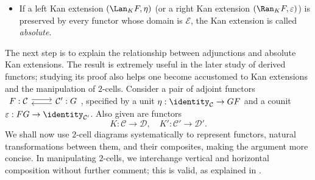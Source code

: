 \begin{definition}
\begin{itemize}
\[\begin{tikzcd}[column sep=large]
			\mathcal{D} \arrow[r, "{\Lan_K F}"'] \arrow[Rightarrow, from=F, "\eta" description] & \mathcal{E} \arrow[r, "M"'] & \mathcal{F}
		\end{tikzcd} =: \begin{tikzcd}
			\mathcal{C} \arrow[rr, "MF", ""{name=MF}] \arrow[rd, "K"'] & & \mathcal{F}  \\
			& \mathcal{D} \arrow[ru, "{M \Lan_K F}"'] \arrow[Rightarrow, from=MF, "M\eta" description] &
		\end{tikzcd}\]
		gives a left Kan extension of $MF$ along $K$.
		\item If a left Kan extension $(\Lan_K F, \eta)$ (or a right Kan
		extension $(\Ran_K F, \varepsilon)$) is preserved by every functor whose
		domain is $\mathcal{E}$, the Kan extension is called \emph{absolute}.
	\end{itemize}
\end{definition}

The next step is to explain the relationship between adjunctions and absolute
Kan extensions. The result is extremely useful in the later study of derived
functors; studying its proof also helps one become accustomed to Kan
extensions and the manipulation of $2$-cells. Consider a pair of adjoint
functors
$\begin{tikzcd}
	F: \mathcal{C} \arrow[r, shift left] & \mathcal{C}' \arrow[l, shift left] : G
\end{tikzcd}$,
specified by a unit $\eta: \identity_{\mathcal{C}} \to GF$ and a counit
$\varepsilon: FG \to \identity_{\mathcal{C}'}$. Also given are functors
\[ K: \mathcal{C} \to \mathcal{D}, \quad K': \mathcal{C}' \to \mathcal{D}'. \]
We shall now use $2$-cell diagrams systematically to represent functors,
natural transformations between them, and their composites, making the
argument more concise. In manipulating $2$-cells, we interchange vertical and
horizontal composition without further comment; this is valid, as explained
in \cite[Lemma 2.2.7]{Li1}.


